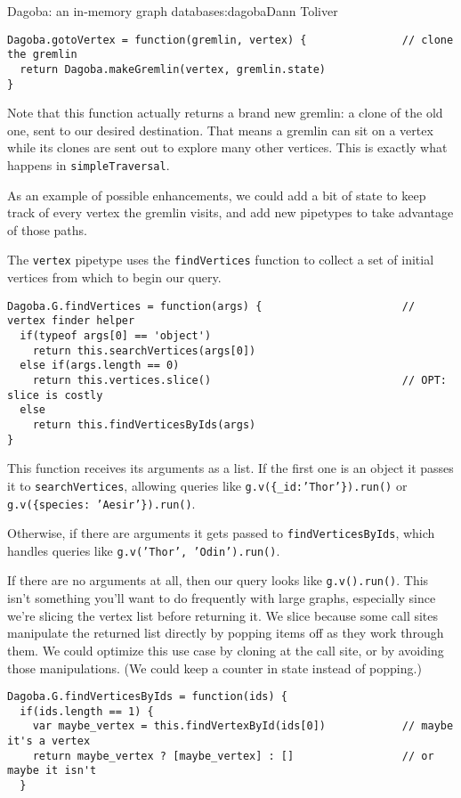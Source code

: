 \begin{aosachapter}{Dagoba: an in-memory graph database}{s:dagoba}{Dann Toliver}
\begin{verbatim}
Dagoba.gotoVertex = function(gremlin, vertex) {               // clone the gremlin
  return Dagoba.makeGremlin(vertex, gremlin.state)
}
\end{verbatim}

Note that this function actually returns a brand new gremlin: a clone of
the old one, sent to our desired destination. That means a gremlin can
sit on a vertex while its clones are sent out to explore many other
vertices. This is exactly what happens in \texttt{simpleTraversal}.

As an example of possible enhancements, we could add a bit of state to
keep track of every vertex the gremlin visits, and add new pipetypes to
take advantage of those paths.

\label{finding}

The \texttt{vertex} pipetype uses the \texttt{findVertices} function to
collect a set of initial vertices from which to begin our query.

\begin{verbatim}
Dagoba.G.findVertices = function(args) {                      // vertex finder helper
  if(typeof args[0] == 'object')
    return this.searchVertices(args[0])
  else if(args.length == 0)
    return this.vertices.slice()                              // OPT: slice is costly
  else
    return this.findVerticesByIds(args)
}
\end{verbatim}

This function receives its arguments as a list. If the first one is an
object it passes it to \texttt{searchVertices}, allowing queries like
\newline \texttt{g.v(\{\_id:'Thor'\}).run()} or
\texttt{g.v(\{species: 'Aesir'\}).run()}.

Otherwise, if there are arguments it gets passed to
\texttt{findVerticesByIds}, which handles queries like
\texttt{g.v('Thor', 'Odin').run()}.

If there are no arguments at all, then our query looks like
\texttt{g.v().run()}. This isn't something you'll want to do frequently
with large graphs, especially since we're slicing the vertex list before
returning it. We slice because some call sites manipulate the returned
list directly by popping items off as they work through them. We could
optimize this use case by cloning at the call site, or by avoiding those
manipulations. (We could keep a counter in state instead of popping.)

\begin{verbatim}
Dagoba.G.findVerticesByIds = function(ids) {
  if(ids.length == 1) {
    var maybe_vertex = this.findVertexById(ids[0])            // maybe it's a vertex
    return maybe_vertex ? [maybe_vertex] : []                 // or maybe it isn't
  }


\end{verbatim}
\end{aosachapter}
